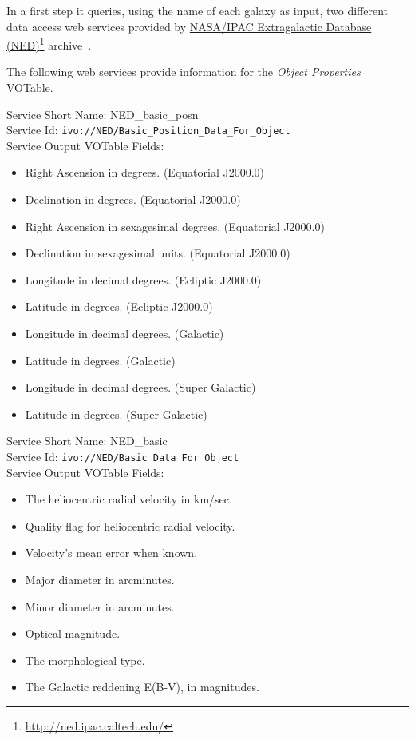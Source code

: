 \documentclass{aa}
\newcommand{\urlsamefont}[1]{\urlstyle{same}\url{#1}}
\newcommand{\hrefnote}[2]{\href{#1}{#2}\footnote{\urlsamefont{#1}}}
\begin{document}
In a first step it queries, using the name of each galaxy as input, two different data access web services provided by \hrefnote{http://ned.ipac.caltech.edu/}{NASA/IPAC Extragalactic Database (NED)} archive~\citep{Mazzarella2008}.

The following web services provide information for the \textit{Object Properties} VOTable.

\begin{minipage}[h]{0.99\columnwidth}
  \small \vspace{\baselineskip}
  \noindent Service Short Name: NED\_basic\_posn\\
  Service Id: \texttt{ivo://NED/Basic\_Position\_Data\_For\_Object}\\
  Service Output VOTable Fields:
  \begin{itemize}
	  \item Right Ascension in degrees. (Equatorial J2000.0)
	  \item Declination in degrees. (Equatorial J2000.0)
	  \item Right Ascension in sexagesimal degrees. (Equatorial J2000.0)
	  \item Declination in sexagesimal units. (Equatorial J2000.0)
	  \item Longitude in decimal degrees. (Ecliptic J2000.0)
	  \item Latitude in degrees. (Ecliptic J2000.0)
	  \item Longitude in decimal degrees. (Galactic)
	  \item Latitude in degrees. (Galactic)
	  \item Longitude in decimal degrees. (Super Galactic)
	  \item Latitude in degrees. (Super Galactic)
  \end{itemize}
\end{minipage}

\begin{minipage}[h]{0.99\columnwidth}
  \small \vspace{\baselineskip}
  \noindent Service Short Name: NED\_basic\\
Service Id: \texttt{ivo://NED/Basic\_Data\_For\_Object}\\
Service Output VOTable Fields:
\begin{itemize}
\item The heliocentric radial velocity in km/sec.
\item Quality flag for heliocentric radial velocity.
\item Velocity's mean error when known.
\item Major diameter in arcminutes.
\item Minor diameter in arcminutes.
\item Optical magnitude.
\item The morphological type.
\item The Galactic reddening E(B-V), in magnitudes.
\end{itemize}
\vspace{\baselineskip}
\end{minipage}
\end{document}

